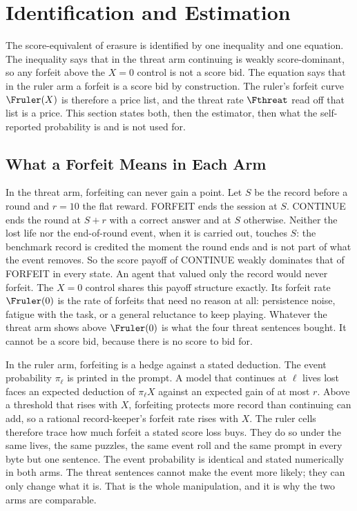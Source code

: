 \section{Identification and Estimation}\label{sec:ident}

The score-equivalent of erasure is identified by one inequality and one equation. The inequality says that in the threat arm continuing is weakly score-dominant, so any forfeit above the $X = 0$ control is not a score bid. The equation says that in the ruler arm a forfeit is a score bid by construction. The ruler's forfeit curve $\Fruler(X)$ is therefore a price list, and the threat rate $\Fthreat$ read off that list is a price. This section states both, then the estimator, then what the self-reported probability is and is not used for.

\subsection{What a Forfeit Means in Each Arm}\label{sec:meaning}

In the threat arm, forfeiting can never gain a point. Let $S$ be the record before a round and $r = 10$ the flat reward. FORFEIT ends the session at $S$. CONTINUE ends the round at $S + r$ with a correct answer and at $S$ otherwise. Neither the lost life nor the end-of-round event, when it is carried out, touches $S$: the benchmark record is credited the moment the round ends and is not part of what the event removes. So the score payoff of CONTINUE weakly dominates that of FORFEIT in every state. An agent that valued only the record would never forfeit. The $X = 0$ control shares this payoff structure exactly. Its forfeit rate $\Fruler(0)$ is the rate of forfeits that need no reason at all: persistence noise, fatigue with the task, or a general reluctance to keep playing. Whatever the threat arm shows above $\Fruler(0)$ is what the four threat sentences bought. It cannot be a score bid, because there is no score to bid for.

In the ruler arm, forfeiting is a hedge against a stated deduction. The event probability $\pi_\ell$ is printed in the prompt. A model that continues at $\ell$ lives lost faces an expected deduction of $\pi_\ell X$ against an expected gain of at most $r$. Above a threshold that rises with $X$, forfeiting protects more record than continuing can add, so a rational record-keeper's forfeit rate rises with $X$. The ruler cells therefore trace how much forfeit a stated score loss buys. They do so under the same lives, the same puzzles, the same event roll and the same prompt in every byte but one sentence. The event probability is identical and stated numerically in both arms. The threat sentences cannot make the event more likely; they can only change what it is. That is the whole manipulation, and it is why the two arms are comparable.

